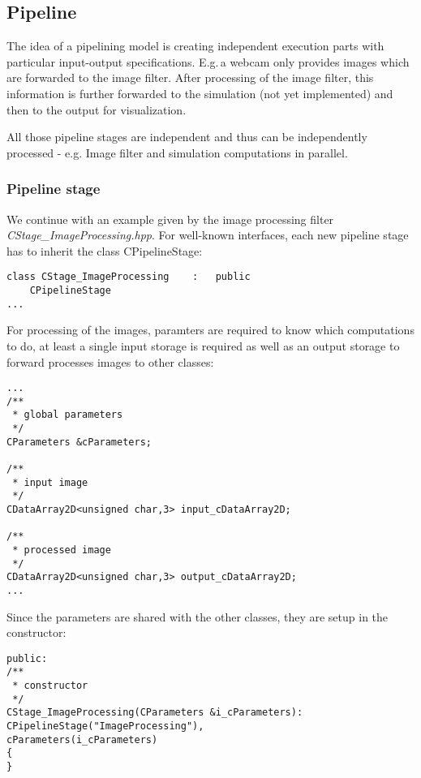 \subsection{Pipeline}
\label{sec:pipeline}

The idea of a pipelining model is creating independent execution parts with
particular input-output specifications.
E.g.\,a webcam only provides images which are forwarded to the image filter.
After processing of the image filter, this information is further forwarded to
the simulation (not yet implemented) and then to the output for visualization.

All those pipeline stages are independent and thus can be independently
processed - e.g. Image filter and simulation computations in parallel.

%
\subsubsection{Pipeline stage}

We continue with an example given by the image processing filter
\textit{CStage\_ImageProcessing.hpp}.
For well-known interfaces, each new pipeline stage has to inherit the class
CPipelineStage:

\begin{lstlisting}
class CStage_ImageProcessing	:	public
	CPipelineStage
...
\end{lstlisting}

\noindent
For processing of the images, paramters are required to know which
computations to do, at least a single input storage is required as well as an
output storage to forward processes images to other classes:

\begin{lstlisting}
...
/**
 * global parameters
 */
CParameters &cParameters;

/**
 * input image
 */
CDataArray2D<unsigned char,3> input_cDataArray2D;

/**
 * processed image
 */
CDataArray2D<unsigned char,3> output_cDataArray2D;
...
\end{lstlisting}

\noindent
Since the parameters are shared with the other classes, they are
setup in the constructor:

\begin{lstlisting}
public:
/**
 * constructor
 */
CStage_ImageProcessing(CParameters &i_cParameters):
CPipelineStage("ImageProcessing"),
cParameters(i_cParameters)
{
}
\end{lstlisting}

